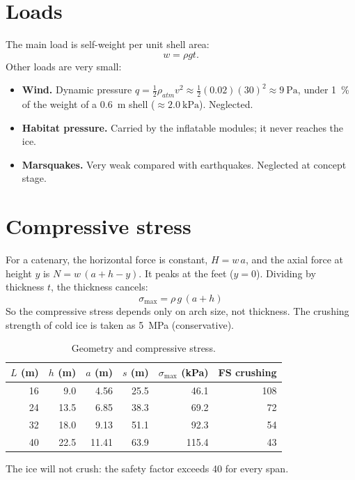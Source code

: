 \documentclass[11pt,a4paper]{article}
\begin{document}
\section{Loads}
The main load is self-weight per unit shell area:
\begin{equation}
w=\rho g t .
\end{equation}
Other loads are very small:
\begin{itemize}
\item \textbf{Wind.} Dynamic pressure $q=\tfrac12\rho_{atm}v^2 \approx \tfrac12(0.02)(30)^2 \approx \SI{9}{\pascal}$, under \SI{1}{\percent} of the weight of a \SI{0.6}{\metre} shell ($\approx\SI{2.0}{\kilo\pascal}$). Neglected.
\item \textbf{Habitat pressure.} Carried by the inflatable modules; it never reaches the ice.
\item \textbf{Marsquakes.} Very weak compared with earthquakes. Neglected at concept stage.
\end{itemize}

\section{Compressive stress}
For a catenary, the horizontal force is constant, $H = w\,a$, and the axial force at height $y$ is $N = w\,(a + h - y)$. It peaks at the feet ($y=0$). Dividing by thickness $t$, the thickness cancels:
\begin{equation}
\boxed{\;\sigma_{\max} = \rho\, g\,(a+h)\;}
\end{equation}
So the compressive stress depends only on arch size, not thickness. The crushing strength of cold ice is taken as \SI{5}{\mega\pascal} (conservative).

\begin{table}[h]\centering\small
\caption{Geometry and compressive stress.}
\begin{tabular}{rrrrrr}\toprule
$L$ (\si{\metre}) & $h$ (\si{\metre}) & $a$ (\si{\metre}) & $s$ (\si{\metre}) & $\sigma_{\max}$ (\si{\kilo\pascal}) & FS crushing \\\midrule
\num{16} & \num{9.0} & \num{4.56} & \num{25.5} & \num{46.1} & \num{108} \\
\num{24} & \num{13.5} & \num{6.85} & \num{38.3} & \num{69.2} & \num{72} \\
\num{32} & \num{18.0} & \num{9.13} & \num{51.1} & \num{92.3} & \num{54} \\
\num{40} & \num{22.5} & \num{11.41} & \num{63.9} & \num{115.4} & \num{43} \\
\bottomrule\end{tabular}
\end{table}
The ice will not crush: the safety factor exceeds 40 for every span.
\end{document}
